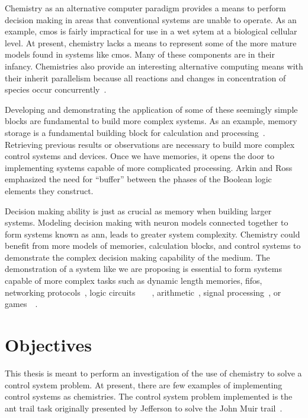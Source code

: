 Chemistry as an alternative computer paradigm provides a means to perform decision making in areas that conventional  systems are unable to operate. As an example, \gls{cmos} is fairly impractical for use in a wet sytem at a biological cellular level. At present, chemistry lacks a means to represent some of the more mature models found in systems like \gls{cmos}. Many of these components are in their infancy. Chemistries also provide an interesting alternative computing means with their inherit parallelism because all reactions and changes in concentration of species occur concurrently~\cite{De_Lacy_Costello2003-yf}.

Developing and demonstrating the application of some of these seemingly simple blocks are fundamental to build more complex systems. As an example, memory storage is a fundamental building block for calculation and processing~\cite{Kanopoulos1986-of}. Retrieving previous results or observations are necessary to build more complex control systems and devices. Once we have memories, it opens the door to implementing systems capable of more complicated processing. Arkin and Ross~\cite{Arkin1994-bs} emphasized the need for ``buffer'' between the phases of the Boolean logic elements they construct.

Decision making ability is just as crucial as memory when building larger systems. Modeling decision making with neuron models connected together to form systems known as \gls{ann}, leads to greater system complexity. Chemistry could benefit from more models of memories, calculation blocks, and control systems to demonstrate the complex decision making capability of the medium. The demonstration of a system like we are proposing is essential to form systems capable of more complex tasks such as dynamic length memories, \glspl{fifo}, networking protocols~\cite{Meyer2011-xn}, logic circuits~\cite{Arkin1994-bs}~\cite{Matsumaru2005-ca}~\cite{Katz2012-fl}~\cite{Banda2013-zs}, arithmetic~\cite{Katz2012-wk}, signal processing~\cite{Jiang2013-gq}, or games~\cite{Stojanovic2003-eg}~\cite{Faulhammer2000-qv}. 

\section{Objectives}
This thesis is meant to perform an investigation of the use of chemistry to solve a control system problem. At present, there are few examples of implementing control systems as chemistries. The control system problem implemented is the ant trail task originally presented by Jefferson to solve the John Muir trail~\cite{Jefferson1992-ph}. 

